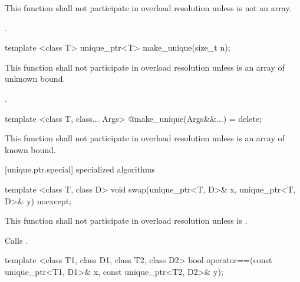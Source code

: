 \begin{itemdescr}
\pnum
\remarks This function shall not participate in overload resolution unless  is not an array.

\pnum
\returns {}.

\end{itemdescr}

%
\begin{itemdecl}
template <class T> unique_ptr<T> make_unique(size_t n);
\end{itemdecl}

\begin{itemdescr}
\pnum
\remarks This function shall not participate in overload resolution unless  is an array of unknown bound.

\pnum
\returns {}.

\end{itemdescr}

%
\begin{itemdecl}
template <class T, class... Args> @\unspec@ make_unique(Args&&...) = delete;
\end{itemdecl}

\begin{itemdescr}
\pnum
\remarks This function shall not participate in overload resolution unless  is an array of known bound.

\end{itemdescr}

[unique.ptr.special]{ specialized algorithms}

%
\begin{itemdecl}
template <class T, class D> void swap(unique_ptr<T, D>& x, unique_ptr<T, D>& y) noexcept;
\end{itemdecl}

\begin{itemdescr}
\pnum
\remarks This function shall not participate in overload resolution
unless  is .

\pnum
\effects Calls .
\end{itemdescr}

%
\begin{itemdecl}
template <class T1, class D1, class T2, class D2>
  bool operator==(const unique_ptr<T1, D1>& x, const unique_ptr<T2, D2>& y);
\end{itemdecl}

